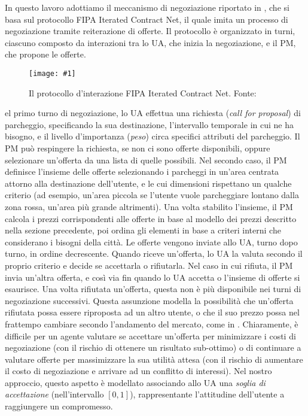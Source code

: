 \documentclass[11pt,a4paper,twoside]{article}
\numberwithin{figure}{section}
\numberwithin{equation}{section}
\newcommand{\img}[6]{
    \begin{figure}[#5]
        \centerline{\texttt{[image: \#1]}}
        \caption{#2}
        \label{#3}
    \end{figure}
}
\begin{document}
In questo lavoro adottiamo il meccanismo di negoziazione riportato in \cite{6}, che si basa sul protocollo \textsf{FIPA Iterated Contract Net}, il quale imita un processo di negoziazione tramite reiterazione di offerte.
Il protocollo è organizzato in turni, ciascuno composto da interazioni tra lo UA, che inizia la negoziazione, e il PM, che propone le offerte.

\img{fipa}{Il protocollo d'interazione FIPA Iterated Contract Net. Fonte: \cite{7}}{fig:2}{.7}{ht}

Nel primo turno di negoziazione, lo UA effettua una richiesta (\emph{call for proposal}) di parcheggio, specificando la sua destinazione, l'intervallo temporale in cui ne ha bisogno, e il livello d'importanza (\emph{peso}) circa specifici attributi del parcheggio. Il PM può respingere la richiesta, se non ci sono offerte disponibili, oppure selezionare un'offerta da una lista di quelle possibili.
Nel secondo caso, il PM definisce l'insieme delle offerte selezionando i parcheggi in un'area centrata attorno alla destinazione dell'utente, e le cui dimensioni rispettano un qualche criterio (ad esempio, un'area piccola se l'utente vuole parcheggiare lontano dalla zona rossa, un'area più grande altrimenti). Una volta stabilito l'insieme, il PM calcola i prezzi corrispondenti alle offerte in base al modello dei prezzi descritto nella sezione precedente, poi ordina gli elementi in base a criteri interni che considerano i bisogni della città. Le offerte vengono inviate allo UA, turno dopo turno, in ordine decrescente.
Quando riceve un'offerta, lo UA la valuta secondo il proprio criterio e decide se accettarla o rifiutarla. Nel caso in cui rifiuta, il PM invia un'altra offerta, e così via fin quando lo UA accetta o l'insieme di offerte si esaurisce. Una volta rifiutata un'offerta, questa non è più disponibile nei turni di negoziazione successivi. Questa assunzione modella la possibilità che un'offerta rifiutata possa essere riproposta ad un altro utente, o che il suo prezzo possa nel frattempo cambiare secondo l'andamento del mercato, come in \cite{8}.
Chiaramente, è difficile per un agente valutare se accettare un'offerta per minimizzare i costi di negoziazione (con il rischio di ottenere un risultato sub-ottimo) o di continuare a valutare offerte per massimizzare la sua utilità attesa (con il rischio di aumentare il costo di negoziazione e arrivare ad un conflitto di interessi). Nel nostro approccio, questo aspetto è modellato associando allo UA una \emph{soglia di accettazione} (nell'intervallo $[0, 1]$), rappresentante l'attitudine dell'utente a raggiungere un compromesso.
\end{document}
